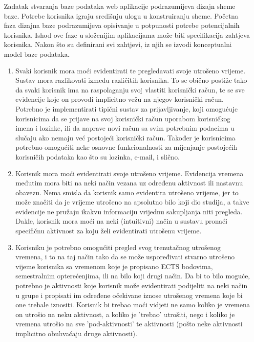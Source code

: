 \documentclass[times, utf8, zavrsni, numeric]{fer}
\begin{document}
Zadatak stvaranja baze podataka web aplikacije podrazumijeva dizajn sheme baze. Potrebe korisnika igraju središnju ulogu u konstruiranju sheme. Početna faza dizajna baze podrazumijeva opisivanje u potpunosti potrebe potencijalnih korisnika. Ishod ove faze u složenijim aplikacijama može biti specifikacija zahtjeva korisnika. Nakon što su definirani svi zahtjevi, iz njih se izvodi konceptualni model baze podataka.
\begin{enumerate}[leftmargin=*]
\item Svaki korisnik mora moći evidentirati te pregledavati svoje utrošeno vrijeme. Sustav mora razlikovati između različitih korisnika. To se obično postiže tako da svaki korisnik ima na raspolaganju svoj vlastiti korisnički račun, te se sve evidencije koje on provodi implicitno vežu na njegov korisnički račun. Potrebno je implementirati tipični sustav za prijavljivanje, koji omogućuje korisnicima da se prijave na svoj korisnički račun uporabom korisničkog imena i lozinke, ili da naprave novi račun sa svim potrebnim podacima u slučaju ako nemaju već postojeći korisnički račun. Također je korisnicima potrebno omogućiti neke osnovne funkcionalnosti za mijenjanje postojećih korisničih podataka kao što su lozinka, e-mail, i slično.

\item Korisnik mora moći evidentirati svoje utrošeno vrijeme. Evidencija vremena međutim mora biti na neki način vezana uz određenu aktivnost ili nastavnu obavezu. Nema smisla da korisnik samo evidentira utrošeno vrijeme, jer to može značiti da je vrijeme utrošeno na apsolutno bilo koji dio studija, a takve evidencije ne pružaju ikakvu informaciju vrijednu sakupljanja niti pregleda. Dakle, korisnik mora moći na neki (intuitivni) način u sustavu pronaći specifičnu aktivnost za koju želi evidentirati utrošenu vrijeme.

\item Korisniku je potrebno omogućiti pregled svog trenutačnog utrošenog vremena, i to na taj način tako da se može uspoređivati stvarno utrošeno vijeme korisnika sa vremenom koje je propisano ECTS bodovima, semestralnim opterećenjima, ili na bilo koji drugi način. Da bi to bilo moguće, potrebno je aktivnosti koje korisnik može evidentirati podijeliti na neki način u grupe i propisati im određene očekivane iznose utrošenog vremena koje bi one trebale iznositi. Korisnik bi trebao moći vidjeti ne samo koliko je vremena on utrošio na neku aktivnost, a koliko je 'trebao' utrošiti, nego i koliko je vremena utrošio na sve 'pod-aktivnosti' te aktivnosti (pošto neke aktivnosti implicitno obuhvaćaju druge aktivnosti).
\end{enumerate}
\end{document}
